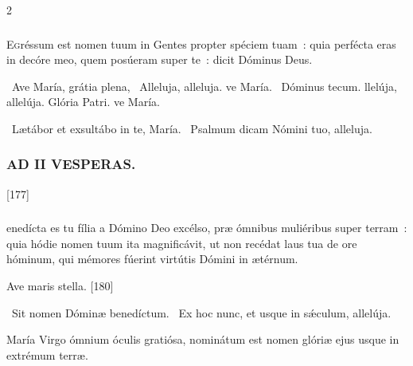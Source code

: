 \documentclass[9pt,twoside]{extarticle}
\begin{document}
\begin{multicols}{2}
\subsubsection*{}
\lettrine{E}gréssum est nomen tuum in Gentes propter spéciem tuam~: quia perfécta eras in decóre meo, quem posúeram super te~: dicit Dóminus Deus.

\begin{tightlist}{}
\item {}~Ave María, grátia plena, \textred{*}~Alleluja, alleluja. ve María. ~Dóminus tecum. llelúja, allelúja. Glória Patri. ve María.
\item {}~Lætábor et exsultábo in te, María. ~Psalmum dicam Nómini tuo, alleluja.
\end{tightlist}

\subsubsection*{\center \textsc{AD II VESPERAS.}}
\begin{tightlist}{}
\item {}
\item {} [177]
\end{tightlist}

\subsubsection*{}
enedícta es tu fília a Dómino Deo excélso, præ ómnibus muliéribus super terram~: quia hódie nomen tuum ita magnificávit, ut non recédat laus tua de ore hóminum, qui mémores fúerint virtútis Dómini in ætérnum.

\begin{tightlist}{}
\item {} Ave maris stella. [180]
\item {}~Sit nomen Dóminæ benedíctum. ~Ex hoc nunc, et usque in sǽculum, allelúja.
\item {} María Virgo ómnium óculis gratiósa, nominátum est nomen glóriæ ejus usque in extrémum terræ.
\end{tightlist}


\end{multicols}
\end{document}
